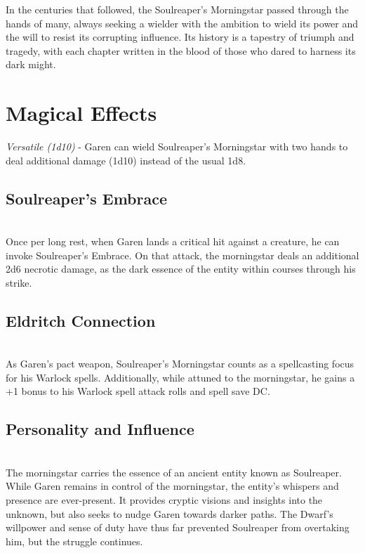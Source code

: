 In the centuries that followed, the Soulreaper's Morningstar passed through the hands of many, always seeking a wielder with the ambition to wield its power and the will to resist its corrupting influence. Its history is a tapestry of triumph and tragedy, with each chapter written in the blood of those who dared to harness its dark might.

\section*{Magical Effects}
\textit{Versatile (1d10)} - Garen can wield Soulreaper's Morningstar with two hands to deal additional damage (1d10) instead of the usual 1d8.
\subsection*{Soulreaper's Embrace}\hfill\\
Once per long rest, when Garen lands a critical hit against a creature, he can invoke Soulreaper's Embrace. On that attack, the morningstar deals an additional 2d6 necrotic damage, as the dark essence of the entity within courses through his strike.
\subsection*{Eldritch Connection}\hfill\\
As Garen's pact weapon, Soulreaper's Morningstar counts as a spellcasting focus for his Warlock spells. Additionally, while attuned to the morningstar, he gains a +1 bonus to his Warlock spell attack rolls and spell save DC.
\subsection*{Personality and Influence}\hfill\\
The morningstar carries the essence of an ancient entity known as Soulreaper. While Garen remains in control of the morningstar, the entity's whispers and presence are ever-present. It provides cryptic visions and insights into the unknown, but also seeks to nudge Garen towards darker paths. The Dwarf's willpower and sense of duty have thus far prevented Soulreaper from overtaking him, but the struggle continues.
